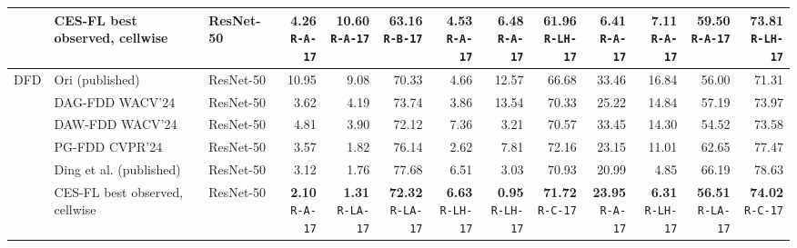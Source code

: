 \documentclass[10pt]{article}
\begin{document}
{\begin{tabular*}{\linewidth}{@{\extracolsep{\fill}}lllrrrrrrrrrr}
\rowcolor{blue!8} & CES-FL best observed, cellwise & ResNet-50 & \shortstack{\textbf{4.26}\\{\tiny\texttt{R-A-17}}} & \shortstack{\textbf{10.60}\\{\tiny\texttt{R-A-17}}} & \shortstack{\textbf{63.16}\\{\tiny\texttt{R-B-17}}} & \shortstack{\textbf{4.53}\\{\tiny\texttt{R-A-17}}} & \shortstack{\textbf{6.48}\\{\tiny\texttt{R-A-17}}} & \shortstack{\textbf{61.96}\\{\tiny\texttt{R-LH-17}}} & \shortstack{\textbf{6.41}\\{\tiny\texttt{R-A-17}}} & \shortstack{\textbf{7.11}\\{\tiny\texttt{R-A-17}}} & \shortstack{\textbf{59.50}\\{\tiny\texttt{R-A-17}}} & \shortstack{\textbf{73.81}\\{\tiny\texttt{R-LH-17}}}\\
\midrule
DFD & Ori (published) & ResNet-50 & 10.95 & 9.08 & 70.33 & 4.66 & 12.57 & 66.68 & 33.46 & 16.84 & 56.00 & 71.31\\
 & DAG-FDD WACV'24 & ResNet-50 & 3.62 & 4.19 & 73.74 & 3.86 & 13.54 & 70.33 & 25.22 & 14.84 & 57.19 & 73.97\\
 & DAW-FDD WACV'24 & ResNet-50 & 4.81 & 3.90 & 72.12 & 7.36 & 3.21 & 70.57 & 33.45 & 14.30 & 54.52 & 73.58\\
 & PG-FDD CVPR'24 & ResNet-50 & 3.57 & 1.82 & 76.14 & 2.62 & 7.81 & 72.16 & 23.15 & 11.01 & 62.65 & 77.47\\
 & Ding et al. (published) & ResNet-50 & 3.12 & 1.76 & 77.68 & 6.51 & 3.03 & 70.93 & 20.99 & 4.85 & 66.19 & 78.63\\
\rowcolor{blue!8} & CES-FL best observed, cellwise & ResNet-50 & \shortstack{\textbf{2.10}\\{\tiny\texttt{R-A-17}}} & \shortstack{\textbf{1.31}\\{\tiny\texttt{R-LA-17}}} & \shortstack{\textbf{72.32}\\{\tiny\texttt{R-LA-17}}} & \shortstack{\textbf{6.63}\\{\tiny\texttt{R-LH-17}}} & \shortstack{\textbf{0.95}\\{\tiny\texttt{R-LH-17}}} & \shortstack{\textbf{71.72}\\{\tiny\texttt{R-C-17}}} & \shortstack{\textbf{23.95}\\{\tiny\texttt{R-A-17}}} & \shortstack{\textbf{6.31}\\{\tiny\texttt{R-LH-17}}} & \shortstack{\textbf{56.51}\\{\tiny\texttt{R-LA-17}}} & \shortstack{\textbf{74.02}\\{\tiny\texttt{R-C-17}}}\\
\bottomrule\end{tabular*}}\par
\end{document}
